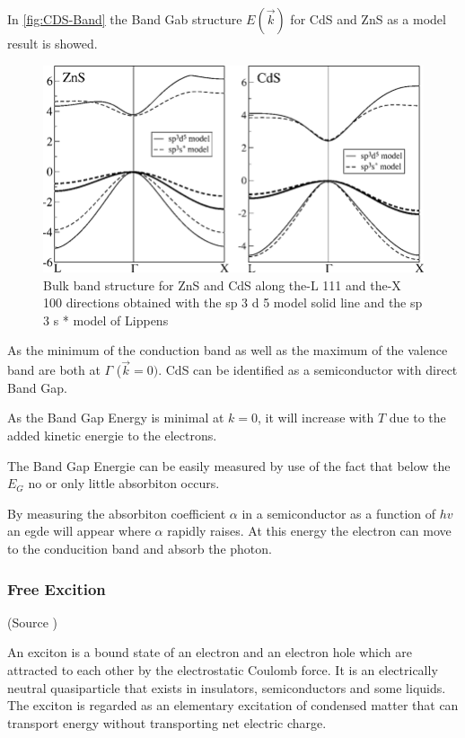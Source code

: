 In \autoref{fig:CDS-Band} the Band Gab structure $E(\vec{k})$ for CdS and ZnS as 
a model result is showed.

\begin{figure}[H]
  \centering
  \includegraphics[width=0.7\linewidth]{Graphics/Chapter3/Bulk-band-structure-for-ZnS-and-CdS-along-the-L-111-and-the-X-100-directions-obtained.png}
  \caption{Bulk band structure for ZnS and CdS along the-L 111 and the-X 100 directions obtained with the sp 3 d 5 
  model solid line and the sp 3 s * model of Lippens \cite{band_gap_CdS}}
  \label{fig:CDS-Band}
\end{figure}

As the minimum of the conduction band as well as the maximum of the valence band are both 
at $\Gamma$ ($\vec{k}= 0)$. CdS can be identified as a semiconductor with
direct Band Gap.

As the Band Gap Energy is minimal at $k=0$, it will increase 
with $T$ due to the added kinetic energie to the electrons.

The Band Gap Energie can be easily measured by use of the fact
that below the $E_G$ no or only little absorbiton occurs.

By measuring the absorbiton coefficient $\alpha$ in a 
semiconductor as a function of $hv$ an egde will appear 
where $\alpha$ rapidly raises. At this energy the electron
can move to the conducition band and absorb the photon.


\subsubsection*{Free Excition}

(Source \cite[Introduction to Solid State Physics p. 312]{kittel})

An exciton is a bound state of an electron and an electron hole which are attracted to each other by the electrostatic Coulomb force. It is an electrically neutral quasiparticle that exists in insulators, semiconductors and some liquids. The exciton is regarded as an elementary excitation of condensed matter that can transport energy without transporting net electric charge.

